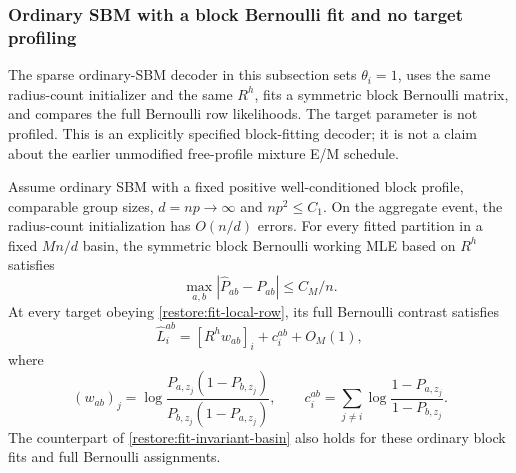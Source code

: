 \subsubsection{Ordinary SBM with a block Bernoulli fit and no target profiling}

The sparse ordinary-SBM decoder in this subsection sets $\theta_i=1$,
uses the same radius-count initializer and the same $R^h$, fits a
symmetric block Bernoulli matrix, and compares the full Bernoulli row
likelihoods. The target parameter is not profiled. This is an explicitly
specified block-fitting decoder; it is not a claim about the earlier
unmodified free-profile mixture E/M schedule.

\begin{proposition}
\label{restore:fit-ordinary}
Assume ordinary SBM with a fixed positive well-conditioned block profile,
comparable group sizes, $d=np\to\infty$ and $np^2\le C_1$.
On the aggregate event, the radius-count initialization has $O(n/d)$
errors. For every fitted partition in a fixed $Mn/d$ basin, the symmetric
block Bernoulli working MLE based on $R^h$ satisfies
\begin{equation}\label{restore:fit-ordinary-parameter}
 \max_{a,b}|\widehat P_{ab}-P_{ab}|\le C_M/n.
\end{equation}
At every target obeying \eqref{restore:fit-local-row}, its full
Bernoulli contrast satisfies
\begin{equation}\label{restore:fit-ordinary-score}
 \widehat L_i^{ab}
    =[R^h w_{ab}]_i+c_i^{ab}+O_M(1),
\end{equation}
where
\[
 (w_{ab})_j=
   \log\frac{P_{a,z_j}(1-P_{b,z_j})}
                  {P_{b,z_j}(1-P_{a,z_j})},\qquad
 c_i^{ab}=\sum_{j\ne i}
       \log\frac{1-P_{a,z_j}}{1-P_{b,z_j}}.
\]
The counterpart of \cref{restore:fit-invariant-basin} also holds for
these ordinary block fits and full Bernoulli assignments.
\end{proposition}

